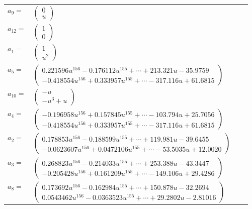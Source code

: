 \documentclass[1p]{elsarticle_modified}
\theoremstyle{definition}
\begin{document}
\begin{tabular}{m{7pt} m{180pt} m{7pt} m{180pt} }
\flushright $a_{9}=$&$\begin{pmatrix}0\\u\end{pmatrix}$ \\
\flushright $a_{12}=$&$\begin{pmatrix}1\\0\end{pmatrix}$ \\
\flushright $a_{1}=$&$\begin{pmatrix}1\\u^2\end{pmatrix}$ \\
\flushright $a_{5}=$&$\begin{pmatrix}0.221596 u^{156}-0.176112 u^{155}+\cdots+213.321 u-35.9759\\-0.418554 u^{156}+0.333957 u^{155}+\cdots-317.116 u+61.6815\end{pmatrix}$ \\
\flushright $a_{10}=$&$\begin{pmatrix}- u\\- u^3+u\end{pmatrix}$ \\
\flushright $a_{4}=$&$\begin{pmatrix}-0.196958 u^{156}+0.157845 u^{155}+\cdots-103.794 u+25.7056\\-0.418554 u^{156}+0.333957 u^{155}+\cdots-317.116 u+61.6815\end{pmatrix}$ \\
\flushright $a_{2}=$&$\begin{pmatrix}0.178853 u^{156}-0.188599 u^{155}+\cdots+119.981 u-39.6455\\-0.0623607 u^{156}+0.0472106 u^{155}+\cdots-53.5035 u+12.0020\end{pmatrix}$ \\
\flushright $a_{3}=$&$\begin{pmatrix}0.268823 u^{156}-0.214033 u^{155}+\cdots+253.388 u-43.3447\\-0.205428 u^{156}+0.161209 u^{155}+\cdots-149.106 u+29.4286\end{pmatrix}$ \\
\flushright $a_{8}=$&$\begin{pmatrix}0.173692 u^{156}-0.162984 u^{155}+\cdots+150.878 u-32.2694\\0.0543462 u^{156}-0.0363523 u^{155}+\cdots+29.2802 u-2.81016\end{pmatrix}$ \\

\end{tabular}
\end{document}
